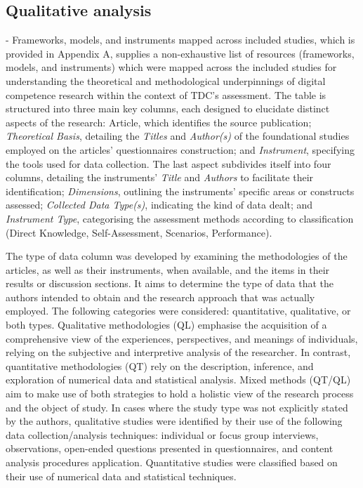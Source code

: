 \documentclass[english]{textolivre}
\begin{document}
\subsection{Qualitative analysis}\label{sec-resumo}
 - Frameworks, models, and instruments mapped across included studies, which is provided in Appendix A, supplies a non-exhaustive list of resources (frameworks, models, and instruments) which were mapped across the included studies for understanding the theoretical and methodological underpinnings of digital competence research within the context of TDC’s assessment. The table is structured into three main key columns, each designed to elucidate distinct aspects of the research: Article, which identifies the source publication; \textit{Theoretical Basis}, detailing the \textit{Titles} and \textit{Author(s)} of the foundational studies employed on the articles’ questionnaires construction; and \textit{Instrument}, specifying the tools used for data collection. The last aspect subdivides itself into four columns, detailing the instruments’ \textit{Title} and \textit{Authors} to facilitate their identification; \textit{Dimensions}, outlining the instruments’ specific areas or constructs assessed; \textit{Collected Data Type(s)}, indicating the kind of data dealt; and \textit{Instrument Type}, categorising the assessment methods according to  classification (Direct Knowledge, Self-Assessment, Scenarios, Performance).

The type of data column was developed by examining the methodologies of the articles, as well as their instruments, when available, and the items in their results or discussion sections. It aims to determine the type of data that the authors intended to obtain and the research approach that was actually employed. The following categories were considered: quantitative, qualitative, or both types. Qualitative methodologies (QL) emphasise the acquisition of a comprehensive view of the experiences, perspectives, and meanings of individuals, relying on the subjective and interpretive analysis of the researcher. In contrast, quantitative methodologies (QT) rely on the description, inference, and exploration of numerical data and statistical analysis. Mixed methods (QT/QL) aim to make use of both strategies to hold a holistic view of the research process and the object of study. In cases where the study type was not explicitly stated by the authors, qualitative studies were identified by their use of the following data collection/analysis techniques: individual or focus group interviews, observations, open-ended questions presented in questionnaires, and content analysis procedures application. Quantitative studies were classified based on their use of numerical data and statistical techniques.
\end{document}
